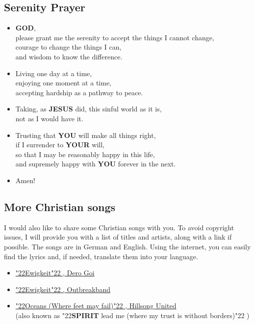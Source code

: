 \documentclass[12pt,a5paper]{article}
\newcommand{\God}[0]{\textbf{GOD}}
\newcommand{\Jesus}[0]{\textbf{JESUS}}
\newcommand{\Spirit}[0]{\textbf{SPIRIT}}
\newcommand{\You}[0]{\textbf{YOU}}
\newcommand{\Your}[0]{\textbf{YOUR}}
\newcommand{\q}[1]{\char"22{#1}\char"22 }
\begin{document}
	\subsection{Serenity Prayer}
		\begin{itemize}[nosep]
			\item	{\God},
			\\		please grant me the serenity to accept the things I cannot change,
			\\		courage to change the things I can,
			\\		and wisdom to know the difference.
			\item	Living one day at a time,
			\\		enjoying one moment at a time,
			\\		accepting hardship as a pathway to peace.
			\item	Taking,
					as {\Jesus} did,
					this sinful world as it is,
			\\		not as I would have it.
			\item	Trusting that {\You} will make all things right,
			\\		if I surrender to {\Your} will,
			\\		so that I may be reasonably happy in this life,
			\\		and supremely happy with {\You} forever in the next.
			\item	Amen!
		\end{itemize}
		 
	\subsection{More Christian songs}
		I would also like to share some Christian songs with you.
		To avoid copyright issues,
		I will provide you with a list of titles and artists,
		along with a link if possible.
		The songs are in German and English.
		Using the internet,
		you can easily find the lyrics and,
		if needed,
		translate them into your language.
		\begin{itemize}[noitemsep]
			\item	\href{https://www.youtube.com/watch?v=Oncj9JBo1xQ}{\q{Ewigkeit},
					Dero Goi}
			\item	\href{https://www.youtube.com/watch?v=PcxaUHkmnSQ}{\q{Ewigkeit},
					Outbreakband}
			\item	\href{https://www.youtube.com/watch?v=DqlpyrHB_Qk}{\q{Oceans (Where feet may fail)},
					Hillsong United}
					\\
					(also known as \q{{\Spirit} lead me (where my trust is without borders)})
		\end{itemize}
				
\end{document}
